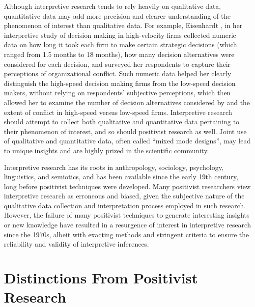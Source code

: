 Although interpretive research tends to rely heavily on qualitative data, quantitative data may add more precision and clearer understanding of the phenomenon of interest than qualitative data. For example, Eisenhardt \cite{eisenhardt1989making}, in her interpretive study of decision making in high-velocity firms collected numeric data on how long it took each firm to make certain strategic decisions (which ranged from 1.5 months to 18 months), how many decision alternatives were considered for each decision, and surveyed her respondents to capture their perceptions of organizational conflict. Such numeric data helped her clearly distinguish the high-speed decision making firms from the low-speed decision makers, without relying on respondents' subjective perceptions, which then allowed her to examine the number of decision alternatives considered by and the extent of conflict in high-speed versus low-speed firms. Interpretive research should attempt to collect both qualitative and quantitative data pertaining to their phenomenon of interest, and so should positivist research as well. Joint use of qualitative and quantitative data, often called ``mixed mode designs'', may lead to unique insights and are highly prized in the scientific community.

Interpretive research has its roots in anthropology, sociology, psychology, linguistics, and \gls{semiotics}, and has been available since the early 19th century, long before positivist techniques were developed. Many positivist researchers view interpretive research as erroneous and biased, given the subjective nature of the qualitative data collection and interpretation process employed in such research. However, the failure of many positivist techniques to generate interesting insights or new knowledge have resulted in a resurgence of interest in interpretive research since the 1970s, albeit with exacting methods and stringent criteria to ensure the reliability and validity of interpretive inferences.

\section{Distinctions From Positivist Research}

